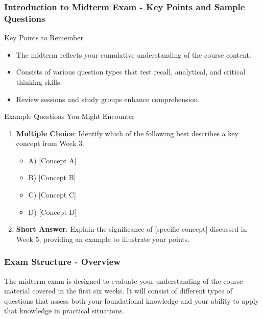 \documentclass{beamer}
\begin{document}
\begin{frame}[fragile]
    \frametitle{Introduction to Midterm Exam - Key Points and Sample Questions}
    \begin{block}{Key Points to Remember}
        \begin{itemize}
            \item The midterm reflects your cumulative understanding of the course content.
            \item Consists of various question types that test recall, analytical, and critical thinking skills.
            \item Review sessions and study groups enhance comprehension.
        \end{itemize}
    \end{block}

    \begin{block}{Example Questions You Might Encounter}
        \begin{enumerate}
            \item \textbf{Multiple Choice}: Identify which of the following best describes a key concept from Week 3.
            \begin{itemize}
                \item A) [Concept A]
                \item B) [Concept B]
                \item C) [Concept C]
                \item D) [Concept D]
            \end{itemize}
            \item \textbf{Short Answer}: Explain the significance of [specific concept] discussed in Week 5, providing an example to illustrate your points.
        \end{enumerate}
    \end{block}
\end{frame}

\begin{frame}[fragile]
    \frametitle{Exam Structure - Overview}
    The midterm exam is designed to evaluate your understanding of the course material covered in the first six weeks. It will consist of different types of questions that assess both your foundational knowledge and your ability to apply that knowledge in practical situations.
\end{frame}
\end{document}
